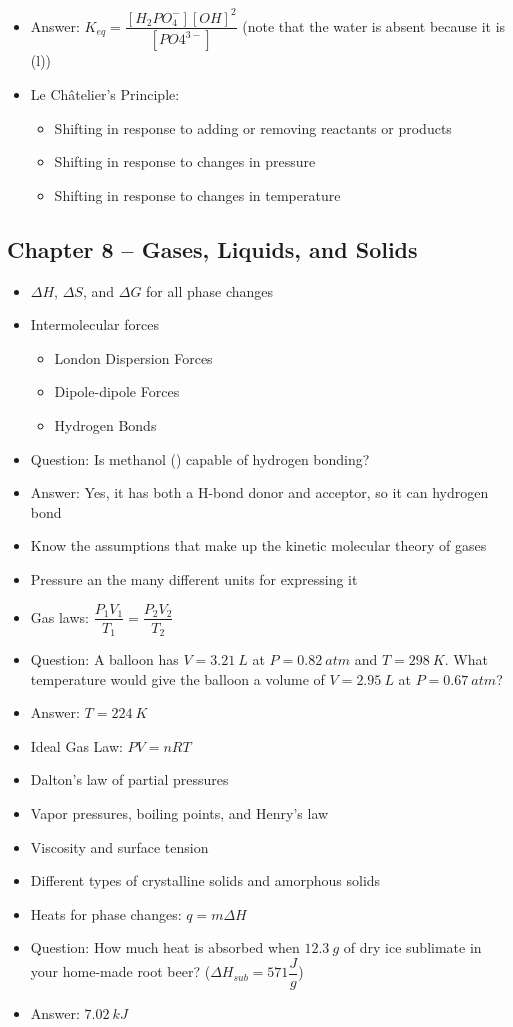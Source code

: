 \documentclass[12pt, letterpaper]{memoir}
\begin{document}
\begin{itemize}
		\item Answer: $K_{eq}=\dfrac{[H_2PO_4^{-}][OH]^2}{[PO4^{3-}]}$ (note that the water is absent because it is (l))
		\item Le Ch\^atelier's Principle:
		\begin{itemize}
			\item Shifting in response to adding or removing reactants or products
			\item Shifting in response to changes in pressure
			\item Shifting in response to changes in temperature
		\end{itemize}
	\end{itemize}
	
	\subsection*{Chapter 8 -- Gases, Liquids, and Solids}
	\begin{itemize}
		\item $\Delta H$, $\Delta S$, and $\Delta G$ for all phase changes
		\item Intermolecular forces
		\begin{itemize}
			\item London Dispersion Forces
			\item Dipole-dipole Forces
			\item Hydrogen Bonds
		\end{itemize}
		\item Question: Is methanol () capable of hydrogen bonding?
		\item Answer: Yes, it has both a H-bond donor and acceptor, so it can hydrogen bond
		\item Know the assumptions that make up the kinetic molecular theory of gases
		\item Pressure an the many different units for expressing it
		\item Gas laws: $\dfrac{P_1V_1}{T_1}=\dfrac{P_2V_2}{T_2}$
		\item Question: A balloon has $V=3.21~L$ at $P=0.82~atm$ and $T=298~K$. What temperature would give the balloon a volume of $V=2.95~L$ at $P=0.67~atm$?
		\item Answer: $T=224~K$
		\item Ideal Gas Law: $PV=nRT$
		\item Dalton's law of partial pressures
		\item Vapor pressures, boiling points, and Henry's law
		\item Viscosity and surface tension
		\item Different types of crystalline solids and amorphous solids
		\item Heats for phase changes: $q=m\Delta H$
		\item Question: How much heat is absorbed when $12.3~g$ of dry ice sublimate in your home-made root beer? ($\Delta H_{sub} = 571\dfrac{J}{g}$)
		\item Answer: $7.02~kJ$
	\end{itemize}
\end{document}
